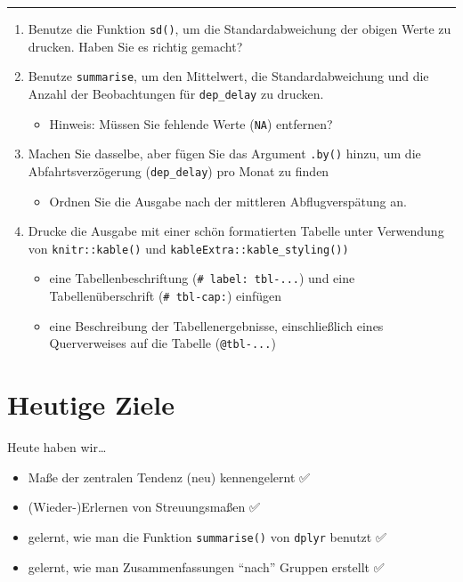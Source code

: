 \documentclass[
  letterpaper,
  DIV=11]{scrartcl}
\providecommand{\tightlist}{%
  \setlength{\itemsep}{0pt}\setlength{\parskip}{0pt}}\usepackage{longtable,booktabs,array}
\begin{document}
\begin{center}\rule{0.5\linewidth}{0.5pt}\end{center}

\begin{enumerate}
\def\labelenumi{\arabic{enumi}.}
\setcounter{enumi}{1}
\tightlist
\item
  Benutze die Funktion \texttt{sd()}, um die Standardabweichung der
  obigen Werte zu drucken. Haben Sie es richtig gemacht?
\item
  Benutze \texttt{summarise}, um den Mittelwert, die Standardabweichung
  und die Anzahl der Beobachtungen für \texttt{dep\_delay} zu drucken.

  \begin{itemize}
  \tightlist
  \item
    Hinweis: Müssen Sie fehlende Werte (\texttt{NA}) entfernen?
  \end{itemize}
\item
  Machen Sie dasselbe, aber fügen Sie das Argument \texttt{.by()} hinzu,
  um die Abfahrtsverzögerung (\texttt{dep\_delay}) pro Monat zu finden

  \begin{itemize}
  \tightlist
  \item
    Ordnen Sie die Ausgabe nach der mittleren Abflugverspätung an.
  \end{itemize}
\item
  Drucke die Ausgabe mit einer schön formatierten Tabelle unter
  Verwendung von \texttt{knitr::kable()} und
  \texttt{kableExtra::kable\_styling())}

  \begin{itemize}
  \tightlist
  \item
    eine Tabellenbeschriftung (\texttt{\#\textbar{}\ label:\ tbl-...})
    und eine Tabellenüberschrift (\texttt{\#\textbar{}\ tbl-cap:})
    einfügen
  \item
    eine Beschreibung der Tabellenergebnisse, einschließlich eines
    Querverweises auf die Tabelle (\texttt{@tbl-...})
  \end{itemize}
\end{enumerate}

\hypertarget{heutige-ziele-1}{%
\section*{Heutige Ziele 🏁}\label{heutige-ziele-1}}

Heute haben wir\ldots{}

\begin{itemize}
\tightlist
\item
  Maße der zentralen Tendenz (neu) kennengelernt ✅
\item
  (Wieder-)Erlernen von Streuungsmaßen ✅
\item
  gelernt, wie man die Funktion \texttt{summarise()} von \texttt{dplyr}
  benutzt ✅
\item
  gelernt, wie man Zusammenfassungen ``nach'' Gruppen erstellt ✅
\end{itemize}
\end{document}
